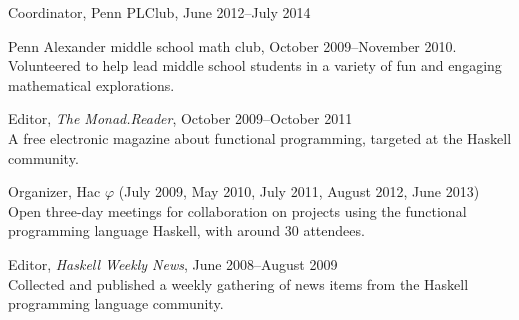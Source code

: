 \documentclass{article}
\newcommand{\cvitem}{\par\hangpara{2em}{1}}
\begin{document}
\cvitem Coordinator, Penn PLClub, June 2012--July 2014

\cvitem Penn Alexander middle school math club, October 2009--November
2010. \\
Volunteered to help lead middle school students in a variety of fun
and engaging mathematical explorations.

\cvitem Editor, \emph{The Monad.Reader}, October 2009--October 2011 \\
A free electronic magazine about functional programming, targeted at
the Haskell community.

\cvitem Organizer, Hac $\varphi$ (July 2009, May 2010, July 2011,
August 2012, June 2013) \\
Open three-day meetings for collaboration on projects using the functional
programming language Haskell, with around 30 attendees.

\cvitem Editor, \emph{Haskell Weekly News}, June 2008--August 2009 \\
Collected and published a weekly gathering of news items from the
Haskell programming language community.
\end{document}
